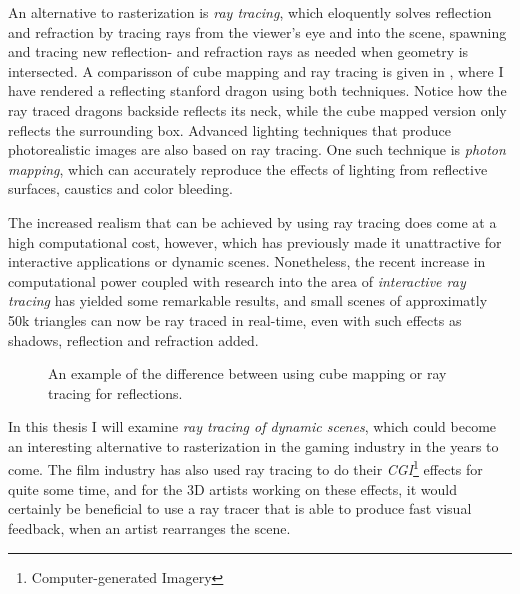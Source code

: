 An alternative to rasterization is \textit{ray tracing}, which eloquently solves
reflection and refraction by tracing rays from the viewer's eye and into the
scene, spawning and tracing new reflection- and refraction rays as needed when
geometry is intersected. A comparisson of cube mapping and ray tracing is given
in , where I have rendered a reflecting stanford
dragon using both techniques. Notice how the ray traced dragons backside
reflects its neck, while the cube mapped version only reflects the surrounding
box. Advanced lighting techniques that produce photorealistic images are also
based on ray tracing. One such technique is \textit{photon mapping}, which can
accurately reproduce the effects of lighting from reflective surfaces, caustics
and color bleeding.




The increased realism that can be achieved by using ray tracing does come at a
high computational cost, however, which has previously made it unattractive for
interactive applications or dynamic scenes. Nonetheless, the recent increase in
computational power coupled with research into the area of \textit{interactive
  ray tracing} has yielded some remarkable results, and small scenes of
approximatly 50k triangles can now be ray traced in real-time, even with such
effects as shadows, reflection and refraction added.

\begin{figure}
  \centering
  \hspace{10pt}
  \caption[Reflections created with cube mapping and ray tracing.]{An example of
    the difference between using cube mapping or ray tracing for
    reflections.}
  \label{fig:reflectingDragons}
\end{figure}



In this thesis I will examine \textit{ray tracing of dynamic scenes}, which
could become an interesting alternative to rasterization in the gaming industry
in the years to come. The film industry has also used ray tracing to do their
\textit{CGI}\footnote{Computer-generated Imagery} effects for quite some time,
and for the 3D artists working on these effects, it would certainly be
beneficial to use a ray tracer that is able to produce fast visual feedback,
when an artist rearranges the scene.

